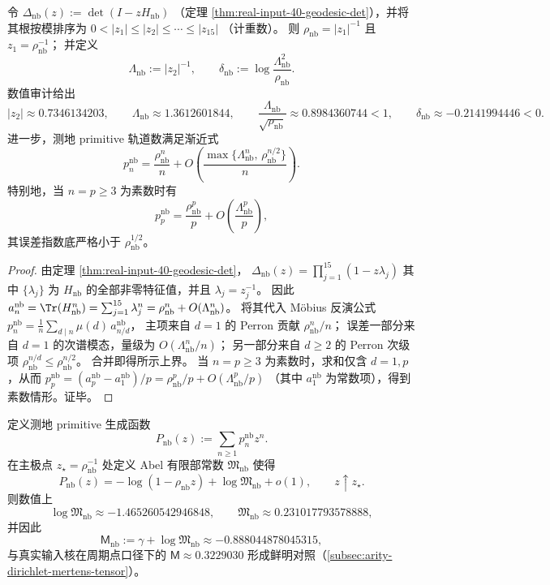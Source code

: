\begin{corollary}\label{cor:real-input-40-geodesic-ramanujan-margin}
令
\(
\Delta_{\mathrm{nb}}(z):=\det(I-zH_{\mathrm{nb}})
\)
（定理 \ref{thm:real-input-40-geodesic-det}），并将其根按模排序为
\(
0<|z_1|\le |z_2|\le\cdots\le |z_{15}|
\)
（计重数）。
则 \(\rho_{\mathrm{nb}}=|z_1|^{-1}\) 且 \(z_1=\rho_{\mathrm{nb}}^{-1}\)；
并定义
\[
\Lambda_{\mathrm{nb}}:=|z_2|^{-1},\qquad
\delta_{\mathrm{nb}}:=\log\frac{\Lambda_{\mathrm{nb}}^2}{\rho_{\mathrm{nb}}}.
\]
数值审计给出
\[
|z_2|\approx 0.7346134203,\qquad
\Lambda_{\mathrm{nb}}\approx 1.3612601844,\qquad
\frac{\Lambda_{\mathrm{nb}}}{\sqrt{\rho_{\mathrm{nb}}}}\approx 0.8984360744<1,
\qquad
\delta_{\mathrm{nb}}\approx -0.2141994446<0.
\]
进一步，测地 primitive 轨道数满足渐近式
\[
p_n^{\mathrm{nb}}
=\frac{\rho_{\mathrm{nb}}^n}{n}
+O\!\left(\frac{\max\{\Lambda_{\mathrm{nb}}^{n},\,\rho_{\mathrm{nb}}^{n/2}\}}{n}\right).
\]
特别地，当 \(n=p\ge 3\) 为素数时有
\[
p_p^{\mathrm{nb}}=\frac{\rho_{\mathrm{nb}}^{p}}{p}+O\!\left(\frac{\Lambda_{\mathrm{nb}}^{p}}{p}\right),
\]
其误差指数底严格小于 \(\rho_{\mathrm{nb}}^{1/2}\)。
\end{corollary}
\begin{proof}
由定理 \ref{thm:real-input-40-geodesic-det}，
\(
\Delta_{\mathrm{nb}}(z)=\prod_{j=1}^{15}(1-z\lambda_j)
\)
其中 \(\{\lambda_j\}\) 为 \(H_{\mathrm{nb}}\) 的全部非零特征值，并且 \(\lambda_j=z_j^{-1}\)。
因此
\(
a_n^{\mathrm{nb}}=\Tr(H_{\mathrm{nb}}^n)=\sum_{j=1}^{15}\lambda_j^n
=\rho_{\mathrm{nb}}^n+O(\Lambda_{\mathrm{nb}}^n)
\)。
将其代入 Möbius 反演公式
\(
p_n^{\mathrm{nb}}=\frac1n\sum_{d\mid n}\mu(d)\,a_{n/d}^{\mathrm{nb}}
\)，
主项来自 \(d=1\) 的 Perron 贡献 \(\rho_{\mathrm{nb}}^n/n\)；
误差一部分来自 \(d=1\) 的次谱模态，量级为 \(O(\Lambda_{\mathrm{nb}}^n/n)\)；
另一部分来自 \(d\ge 2\) 的 Perron 次级项 \(\rho_{\mathrm{nb}}^{n/d}\le \rho_{\mathrm{nb}}^{n/2}\)。
合并即得所示上界。
当 \(n=p\ge 3\) 为素数时，求和仅含 \(d=1,p\)，从而
\(
p_p^{\mathrm{nb}}=(a_p^{\mathrm{nb}}-a_1^{\mathrm{nb}})/p
=\rho_{\mathrm{nb}}^{p}/p+O(\Lambda_{\mathrm{nb}}^{p}/p)
\)
（其中 \(a_1^{\mathrm{nb}}\) 为常数项），得到素数情形。证毕。
\end{proof}

\begin{theorem}\label{thm:real-input-40-geodesic-mertens}
定义测地 primitive 生成函数
\[
P_{\mathrm{nb}}(z):=\sum_{n\ge 1}p_n^{\mathrm{nb}}z^n.
\]
在主极点 \(z_\star=\rho_{\mathrm{nb}}^{-1}\) 处定义 Abel 有限部常数 \(\mathfrak{M}_{\mathrm{nb}}\) 使得
\[
P_{\mathrm{nb}}(z)=-\log(1-\rho_{\mathrm{nb}}z)+\log\mathfrak{M}_{\mathrm{nb}}+o(1),
\qquad z\uparrow z_\star.
\]
则数值上
\[
\boxed{
\log\mathfrak{M}_{\mathrm{nb}}\approx -1.465260542946848,\qquad
\mathfrak{M}_{\mathrm{nb}}\approx 0.231017793578888,
}
\]
并因此
\[
\boxed{
\mathsf{M}_{\mathrm{nb}}:=\gamma+\log\mathfrak{M}_{\mathrm{nb}}\approx -0.888044878045315,
}
\]
与真实输入核在周期点口径下的 \(\mathsf{M}\approx 0.3229030\) 形成鲜明对照（\ref{subsec:arity-dirichlet-mertens-tensor}）。
\end{theorem}

